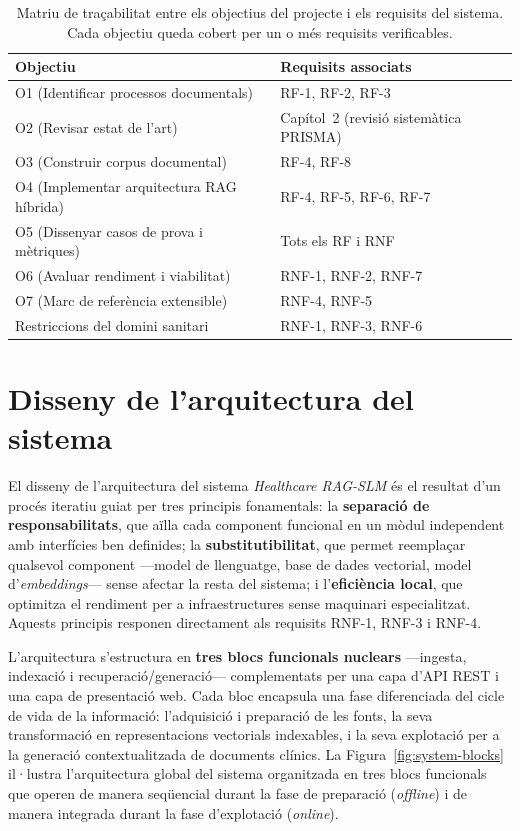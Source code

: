 \documentclass[CAT]{TFUOC}%
\begin{document}
\begin{table}[H]
\centering
\small
\begin{tabular}{lp{8.5cm}}
\hline
\textbf{Objectiu} & \textbf{Requisits associats} \\
\hline
O1 (Identificar processos documentals) & RF-1, RF-2, RF-3 \\
O2 (Revisar estat de l'art) & Capítol~2 (revisió sistemàtica PRISMA) \\
O3 (Construir corpus documental) & RF-4, RF-8 \\
O4 (Implementar arquitectura RAG híbrida) & RF-4, RF-5, RF-6, RF-7 \\
O5 (Dissenyar casos de prova i mètriques) & Tots els RF i RNF \\
O6 (Avaluar rendiment i viabilitat) & RNF-1, RNF-2, RNF-7 \\
O7 (Marc de referència extensible) & RNF-4, RNF-5 \\
Restriccions del domini sanitari & RNF-1, RNF-3, RNF-6 \\
\hline
\end{tabular}
\caption{Matriu de traçabilitat entre els objectius del projecte i els requisits del sistema. Cada objectiu queda cobert per un o més requisits verificables.}
\label{tab:traceability}
\end{table}

\section{Disseny de l'arquitectura del sistema}

El disseny de l'arquitectura del sistema \textit{Healthcare RAG-SLM} és el resultat d'un procés iteratiu guiat per tres principis fonamentals: la \textbf{separació de responsabilitats}, que aïlla cada component funcional en un mòdul independent amb interfícies ben definides; la \textbf{substitutibilitat}, que permet reemplaçar qualsevol component ---model de llenguatge, base de dades vectorial, model d'\textit{embeddings}--- sense afectar la resta del sistema; i l'\textbf{eficiència local}, que optimitza el rendiment per a infraestructures sense maquinari especialitzat. Aquests principis responen directament als requisits RNF-1, RNF-3 i RNF-4.

L'arquitectura s'estructura en \textbf{tres blocs funcionals nuclears} ---ingesta, indexació i recuperació/generació--- complementats per una capa d'API REST i una capa de presentació web. Cada bloc encapsula una fase diferenciada del cicle de vida de la informació: l'adquisició i preparació de les fonts, la seva transformació en representacions vectorials indexables, i la seva explotació per a la generació contextualitzada de documents clínics. La Figura~\ref{fig:system-blocks} il·lustra l'arquitectura global del sistema organitzada en tres blocs funcionals que operen de manera seqüencial durant la fase de preparació (\textit{offline}) i de manera integrada durant la fase d'explotació (\textit{online}).
\end{document}
